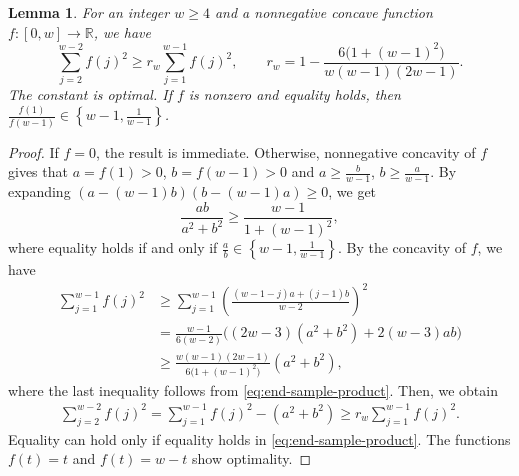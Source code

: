 \documentclass[reqno, 11pt]{article}
\numberwithin{equation}{section}
\newtheorem{lemma}[lemma]{Lemma}
\theoremstyle{definition}
\newcommand{\R}{\mathbb R}
\numberwithin{equation}{section}
\begin{document}
\begin{lemma}\label{g:share}
For an integer $w\ge4$ and a nonnegative concave function $f:[0,w]\to\R$, we have 
\[
\sum_{j=2}^{w-2}f(j)^2\ge r_w\sum_{j=1}^{w-1}f(j)^2,\qquad
r_w=1-\frac{6\bigl(1+(w-1)^2\bigr)}{w(w-1)(2w-1)}.
\]
The constant is optimal. If $f$ is nonzero and equality holds, then $\frac{f(1)}{f(w-1)}\in\left\{w-1,\frac{1}{w-1}\right\}$.
\end{lemma}
\begin{proof}
If $f=0$, the result is immediate. Otherwise, nonnegative concavity of $f$ gives that $a=f(1)>0$, $b=f(w-1)>0$ and
$a\ge \frac{b}{w-1}$, $b\ge \frac{a}{w-1}$. By expanding $(a-(w-1)b)(b-(w-1)a)\ge0$, we get 
\begin{equation}\label{eq:end-sample-product}
 \frac{ab}{a^2+b^2}\ge\frac{w-1}{1+(w-1)^2},
\end{equation}
where equality holds if and only if $\frac{a}{b}\in\left\{w-1,\frac{1}{w-1}\right\}$. By the concavity of $f$, we have
\[
\begin{aligned}
\sum_{j=1}^{w-1}f(j)^2
&\ge\sum_{j=1}^{w-1}
\left(\frac{(w-1-j)a+(j-1)b}{w-2}\right)^2\\
&=\frac{w-1}{6(w-2)}
\bigl((2w-3)(a^2+b^2)+2(w-3)ab\bigr)\\
&\ge\frac{w(w-1)(2w-1)}
{6\bigl(1+(w-1)^2\bigr)}(a^2+b^2),
\end{aligned}
\]
where the last inequality follows from \eqref{eq:end-sample-product}. Then, we obtain
\[
\begin{aligned}
\sum_{j=2}^{w-2}f(j)^2=\sum_{j=1}^{w-1}f(j)^2-(a^2+b^2)\ge r_w\sum_{j=1}^{w-1}f(j)^2.
\end{aligned}
\]
Equality can hold only if equality holds in \eqref{eq:end-sample-product}.
The functions $f(t)=t$ and $f(t)=w-t$ show optimality.
\end{proof}
\end{document}
